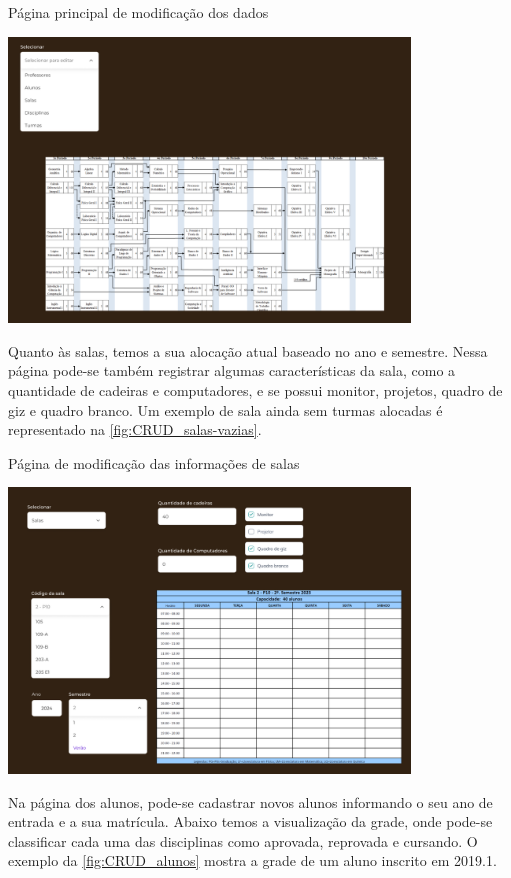 \begin{MyCenteredFigure}
  \caption{Página principal de modificação dos dados}
  \label{fig:CRUD_main}
  \includegraphics[width=0.8\textwidth]{files/img/Prototipo/Medio/CRUD_main}
\end{MyCenteredFigure} %

Quanto às salas, temos a sua alocação atual baseado no ano e semestre. Nessa página pode-se também registrar algumas características da sala, como a quantidade de cadeiras e computadores, e se possui monitor, projetos, quadro de giz e quadro branco. Um exemplo de sala ainda sem turmas alocadas é representado na \autoref{fig:CRUD_salas-vazias}.

\begin{MyCenteredFigure}
  \caption{Página de modificação das informações de salas}
  \label{fig:CRUD_salas-vazias}
  \includegraphics[width=0.8\textwidth]{files/img/Prototipo/Medio/CRUD_salas-vazias}
\end{MyCenteredFigure} %

Na página dos alunos, pode-se cadastrar novos alunos informando o seu ano de entrada e a sua matrícula. Abaixo temos a visualização da grade, onde pode-se classificar cada uma das disciplinas como aprovada, reprovada e cursando. O exemplo da \autoref{fig:CRUD_alunos} mostra a grade de um aluno inscrito em 2019.1.

